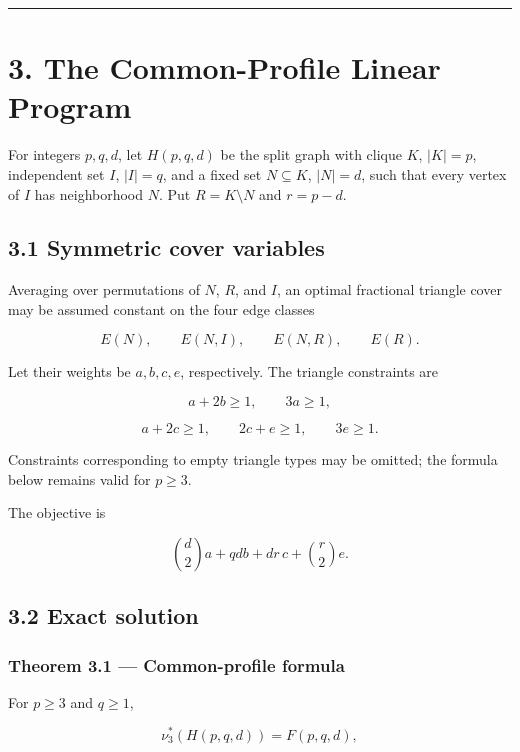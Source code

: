 \documentclass[
  11pt,
]{article}
\begin{document}
\begin{center}\rule{0.5\linewidth}{0.5pt}\end{center}

\section{3. The Common-Profile Linear Program}\label{the-common-profile-linear-program}

For integers \(p,q,d\), let \(H(p,q,d)\) be the split graph with clique \(K\), \(|K|=p\), independent set \(I\), \(|I|=q\), and a fixed set \(N\subseteq K\), \(|N|=d\), such that every vertex of \(I\) has neighborhood \(N\). Put \(R=K\setminus N\) and \(r=p-d\).

\subsection{3.1 Symmetric cover variables}\label{symmetric-cover-variables}

Averaging over permutations of \(N\), \(R\), and \(I\), an optimal fractional triangle cover may be assumed constant on the four edge classes

\[
E(N),
\qquad E(N,I),
\qquad E(N,R),
\qquad E(R).
\]

Let their weights be \(a,b,c,e\), respectively. The triangle constraints are

\[
a+2b\ge1,
\qquad
3a\ge1,
\tag{3.1}
\]

\[
a+2c\ge1,
\qquad
2c+e\ge1,
\qquad
3e\ge1.
\tag{3.2}
\]

Constraints corresponding to empty triangle types may be omitted; the formula below remains valid for \(p\ge3\).

The objective is

\[
\binom d2a+qdb+dr\,c+\binom r2e.
\tag{3.3}
\]

\subsection{3.2 Exact solution}\label{exact-solution}

\subsubsection{Theorem 3.1 --- Common-profile formula}\label{theorem-3.1-common-profile-formula}

For \(p\ge3\) and \(q\ge1\),

\[
\boxed{
\nu_3^*(H(p,q,d))
=
F(p,q,d),
}
\tag{3.4}
\]
\end{document}
